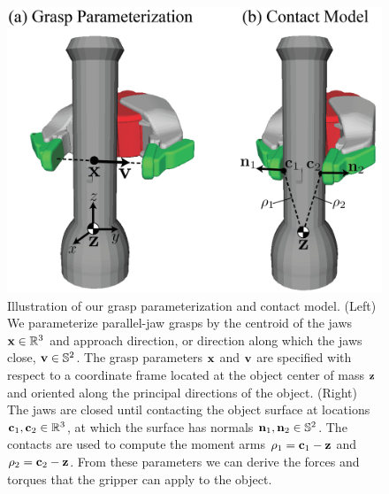\begin{figure}[t!]
\centering
\includegraphics[scale=0.4]{figures/illustrations/dexnet_grasping_model.png}
\caption{Illustration of our grasp parameterization and contact model. (Left) We parameterize parallel-jaw grasps by the centroid of the jaws $\mathbf{x} \in \mathbb{R}^3$ and approach direction, or direction along which the jaws close, $\mathbf{v} \in \mathbb{S}^2$. The grasp parameters $\mathbf{x}$ and $\mathbf{v}$ are specified with respect to a coordinate frame located at the object center of mass $\mathbf{z}$ and oriented along the principal directions of the object. (Right) The jaws are closed until contacting the object surface at locations $\mathbf{c}_1, \mathbf{c}_2 \in \mathbb{R}^3$, at which the surface has normals $\mathbf{n}_1, \mathbf{n}_2 \in \mathbb{S}^2$. The contacts are used to compute the moment arms $\rho_1 = \mathbf{c}_1 - \mathbf{z}$ and $\rho_2  = \mathbf{c}_2 - \mathbf{z}$. From these parameters we can derive the forces and torques that the gripper can apply to the object. }
\vspace*{-15pt}
\end{figure}

